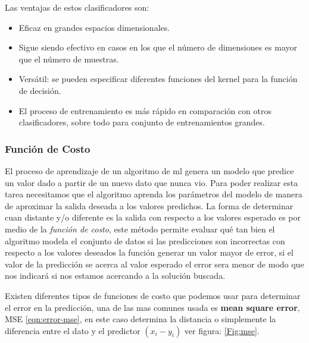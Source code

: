 Las ventajas de estos clasificadores son:
\begin{itemize}
\item Eficaz en grandes espacios dimensionales.
\item Sigue siendo efectivo en casos en los que el número de dimensiones es mayor que el número de muestras.
\item Versátil: se pueden especificar diferentes funciones del kernel para la función de decisión.
\item El proceso de entrenamiento es más rápido en comparación con otros clasificadores, sobre todo para conjunto de entrenamientos grandes.
\end{itemize}

\subsubsection{Función de Costo}\label{sub:funcion_costo}

El proceso de aprendizaje de un algoritmo de \ac{ml} genera un  modelo que predice un valor dado a partir de un nuevo dato que nunca vio. Para poder realizar esta tarea necesitamos que el algoritmo aprenda los parámetros del modelo de manera de aproximar la salida deseada a los valores predichos. La forma de determinar cuan distante y/o diferente es la salida con respecto a los valores esperado es por medio de la \textit{función de costo}, este método permite evaluar qué tan bien el algoritmo modela el conjunto de datos si las predicciones son incorrectas con respecto a los valores deseados la función generar un valor mayor de error, si el valor de la predicción se acerca al valor esperado el error sera menor de modo que nos indicará si nos estamos acercando a la solución buscada.

Existen diferentes tipos de funciones de costo que podemos usar para determinar el error en la predicción, una de las mas comunes usada es \textbf{mean square error}, MSE \ref{eqn:error-mse}, en este caso determina la distancia o simplemente la diferencia entre el dato y el predictor $(x_i - y_i) $ ver figura: \ref{Fig:mse}.



